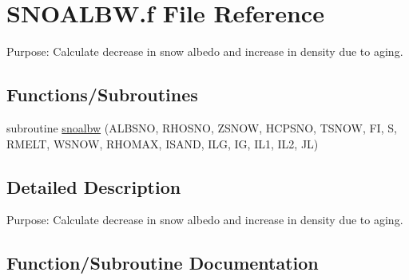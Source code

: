 \hypertarget{SNOALBW_8f}{}\section{S\+N\+O\+A\+L\+B\+W.\+f File Reference}
\label{SNOALBW_8f}


Purpose\+: Calculate decrease in snow albedo and increase in density due to aging.  


\subsection*{Functions/\+Subroutines}
\begin{DoxyCompactItemize}
\item 
subroutine \hyperlink{SNOALBW_8f_aa22cbc1a38c6f3907d9201392f600902}{snoalbw} (A\+L\+B\+S\+N\+O, R\+H\+O\+S\+N\+O, Z\+S\+N\+O\+W, H\+C\+P\+S\+N\+O, T\+S\+N\+O\+W, F\+I, S, R\+M\+E\+L\+T, W\+S\+N\+O\+W, R\+H\+O\+M\+A\+X, I\+S\+A\+N\+D, I\+L\+G, I\+G, I\+L1, I\+L2, J\+L)
\end{DoxyCompactItemize}


\subsection{Detailed Description}
Purpose\+: Calculate decrease in snow albedo and increase in density due to aging. 



\subsection{Function/\+Subroutine Documentation}
\hypertarget{SNOALBW_8f_aa22cbc1a38c6f3907d9201392f600902}{}
